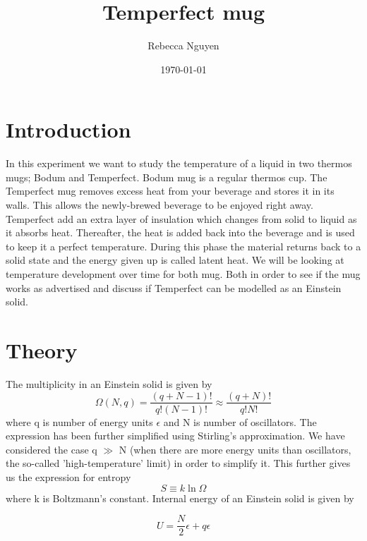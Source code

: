 \documentclass[reprint,english,notitlepage]{revtex4-2}
\begin{document}
\title{Temperfect mug}   %
\author{Rebecca Nguyen}               %
\date{\today}                             %
\noaffiliation
\maketitle                                %


\section{Introduction}
In this experiment we want to study the temperature of a liquid in two thermos mugs; Bodum and Temperfect.
Bodum mug is a regular thermos cup. The Temperfect mug removes excess heat from your beverage and stores it in its walls. This allows the newly-brewed beverage to
be enjoyed right away. Temperfect add an extra layer of insulation which changes from solid to liquid as it absorbs heat. Thereafter, the heat is added back into the beverage and is used to keep it a perfect temperature. During this phase the material returns back to a solid state and the energy given up is called latent heat.
We will be looking at temperature development over time for both mug. Both in order to see if the mug works as advertised and discuss if Temperfect can be modelled as an Einstein solid.

\section{Theory}
The multiplicity in an Einstein solid is given by
\begin{equation}
  \Omega(N, q) = \frac{(q+N -1)!}{q! (N -1)!} \approx \frac{(q+N)!}{q!N!}
\end{equation}
where q is number of energy units $\epsilon$ and N is number of oscillators. The expression has been further simplified using Stirling's approximation. We have considered the case q $\gg$ N (when there are
more energy units than oscillators, the so-called 'high-temperature' limit) in order to simplify it.
This further gives us the expression for entropy
\begin{equation}
  S \equiv k \ln\Omega
\end{equation}
where k is Boltzmann's constant.
Internal energy of an Einstein solid is given by

\begin{equation}
  U = \frac{N}{2}\epsilon + q\epsilon
\end{equation}
\end{document}
